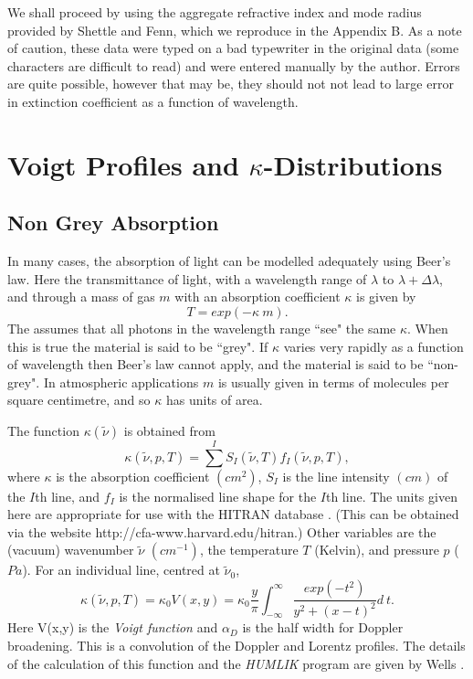 \documentclass[12pt]{article}
\begin{document}
We shall proceed by using the aggregate refractive index and mode radius 
provided by Shettle and Fenn, which we reproduce in the Appendix B. 
As a note of caution, these data were typed on a bad typewriter in the original 
data (some characters are difficult
to read) and were entered manually by the author. Errors are quite possible, however
 that may be, they should not  not lead to
large error in extinction coefficient as a function of wavelength.


\newpage

\appendix

\section{Voigt Profiles and $\kappa$-Distributions} 

\subsection{Non Grey Absorption}

In many cases, the absorption of light can be modelled adequately
using Beer's law. Here the transmittance of light, with a wavelength
range of $\lambda$ to $\lambda+\Delta \lambda$, and through a mass
of gas $m$ with an absorption coefficient $\kappa$ is given by
\begin{equation}
    T=exp(-\kappa\>m).
\end{equation}
The assumes that all photons in the wavelength range ``see" the same
$\kappa$. When this is true the material is said to be ``grey".
If $\kappa$ varies very rapidly as a function of wavelength
then Beer's law cannot apply, and the material is said to be ``non-grey".
In atmospheric applications $m$ is usually given in terms of molecules
 per square centimetre, and so $\kappa$ has units of area.


The function $\kappa(\tilde{\nu})$ is obtained from
\begin{equation}
    \kappa(\tilde{\nu},p,T)=\sum^I S_I(\tilde{\nu},T) f_I(\tilde{\nu},p,T),
\end{equation}
where $\kappa$ is the absorption coefficient $(cm^{2})$, $S_I$
is the line intensity $(cm)$ of the $I$th line, and $f_I$
is the normalised line shape for the $I$th line.
The units given here are appropriate for use with the HITRAN database
\cite{RothmanETAL:Mybib}.
(This can be obtained via the website http://cfa-www.harvard.edu/hitran.)
Other variables are the (vacuum) wavenumber $\tilde{\nu}$ $(cm^{-1})$, the temperature $T$ (Kelvin),
and pressure $p$ ($Pa$). For an individual line, centred at $\tilde{\nu}_0$, 
\begin{equation}
    \kappa(\tilde{\nu},p,T)=\kappa_0 V(x,y)=  \kappa_0 \frac{y}{\pi} \int_{-\infty}^{\infty} \frac{exp(-t^2)}{y^2+(x-t)^2} d\>t.
\end{equation}
Here V(x,y) is the {\it Voigt function} and $\alpha_D$ is the half width for Doppler broadening. This is a convolution of the
Doppler and Lorentz profiles. The details of the calculation of this function and the {\it HUMLIK} program
 are given by Wells \cite{BobWells:Mybib}.
\end{document}
